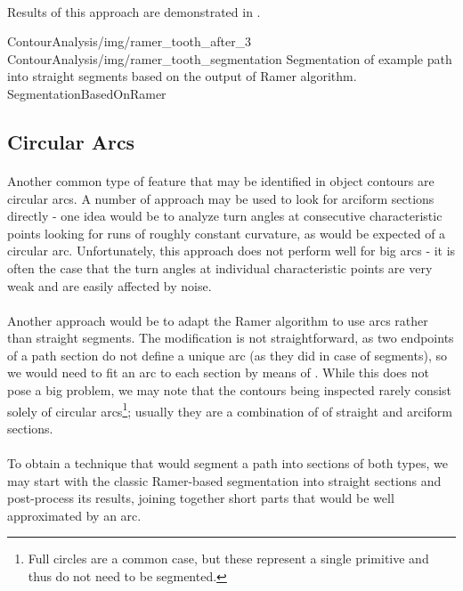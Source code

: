 \paragraph*{}
Results of this approach are demonstrated in .

\twoFigures
{ContourAnalysis/img/ramer_tooth_after_3}
{ContourAnalysis/img/ramer_tooth_segmentation}
{Segmentation of example path into straight segments based on the output of Ramer algorithm.}
{SegmentationBasedOnRamer}
{\basicWidth}

\subsection{Circular Arcs}

\paragraph*{}
Another common type of feature that may be identified in object contours are circular arcs. A number of approach may be used to look for arciform sections directly - one idea would be to analyze turn angles at consecutive characteristic points looking for runs of roughly constant curvature, as would be expected of a circular arc. Unfortunately, this approach does not perform well for big arcs - it is often the case that the turn angles at individual characteristic points are very weak and are easily affected by noise.

\paragraph*{}
Another approach would be to adapt the Ramer algorithm to use arcs rather than straight segments. The modification is not straightforward, as two endpoints of a path section do not define a unique arc (as they did in case of segments), so we would need to fit an arc to each section by means of . While this does not pose a big problem, we may note that the contours being inspected rarely consist solely of circular arcs\footnote{Full circles are a common case, but these represent a single primitive and thus do not need to be segmented.}; usually they are a combination of of straight and arciform sections.

\paragraph*{}
To obtain a technique that would segment a path into sections of both types, we may start with the classic Ramer-based segmentation into straight sections and post-process its results, joining together short parts that would be well approximated by an arc.

